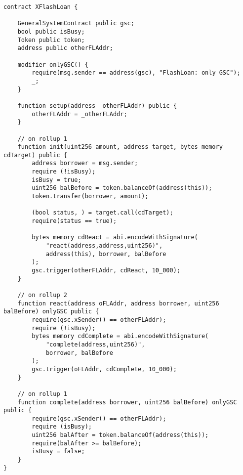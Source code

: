 
\begin{lstlisting}[language=Solidity]
contract XFlashLoan {

    GeneralSystemContract public gsc;
    bool public isBusy;
    Token public token;
    address public otherFLAddr;

    modifier onlyGSC() {
        require(msg.sender == address(gsc), "FlashLoan: only GSC");
        _;
    }

    function setup(address _otherFLAddr) public {
        otherFLAddr = _otherFLAddr;
    }

    // on rollup 1
    function init(uint256 amount, address target, bytes memory cdTarget) public {
        address borrower = msg.sender;
        require (!isBusy);
        isBusy = true;
        uint256 balBefore = token.balanceOf(address(this));
        token.transfer(borrower, amount);

        (bool status, ) = target.call(cdTarget);
        require(status == true);

        bytes memory cdReact = abi.encodeWithSignature(
            "react(address,address,uint256)", 
            address(this), borrower, balBefore
        );
        gsc.trigger(otherFLAddr, cdReact, 10_000);
    }

    // on rollup 2
    function react(address oFLAddr, address borrower, uint256 balBefore) onlyGSC public {
        require(gsc.xSender() == otherFLAddr);
        require (!isBusy);
        bytes memory cdComplete = abi.encodeWithSignature(
            "complete(address,uint256)", 
            borrower, balBefore
        );
        gsc.trigger(oFLAddr, cdComplete, 10_000);
    }

    // on rollup 1
    function complete(address borrower, uint256 balBefore) onlyGSC public {
        require(gsc.xSender() == otherFLAddr);
        require (isBusy);
        uint256 balAfter = token.balanceOf(address(this));
        require(balAfter >= balBefore);
        isBusy = false;
    }
}
\end{lstlisting}


